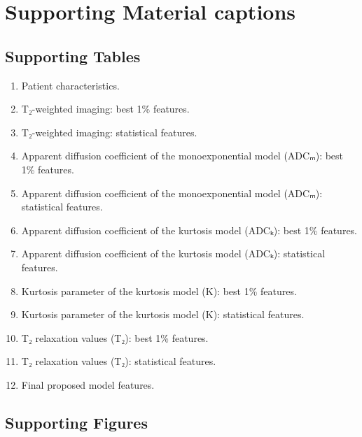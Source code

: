 \newcommand{\fig}[2]{\item Patient #1: #2 map, prostate mask, lesion masks.}
\newcommand{\figADCm}[1]{\fig{#1}{ADCₘ}}
\newcommand{\figTtw}[1]{\fig{#1}{T₂w}}
\newcommand{\figTt}[1]{\fig{#1}{T₂}}

\newcommand{\histology}[2]{\item Patient #1: #2.}
\newcommand{\pink}[1]{\histology{#1}{prostatectomy section}}


\section{Supporting Material captions}

\subsection{Supporting Tables}

\begin{enumerate}
\item Patient characteristics.
\item T₂-weighted imaging: best 1\% features.
\item T₂-weighted imaging: statistical features.
\item Apparent diffusion coefficient of the monoexponential model (ADCₘ): best
  1\% features.
\item Apparent diffusion coefficient of the monoexponential model (ADCₘ):
  statistical features.
\item Apparent diffusion coefficient of the kurtosis model (ADCₖ): best 1\%
  features.
\item Apparent diffusion coefficient of the kurtosis model (ADCₖ): statistical
  features.
\item Kurtosis parameter of the kurtosis model (K): best 1\% features.
\item Kurtosis parameter of the kurtosis model (K): statistical features.
\item T₂ relaxation values (T₂): best 1\% features.
\item T₂ relaxation values (T₂): statistical features.
\item Final proposed model features.
\end{enumerate}


\subsection{Supporting Figures}

